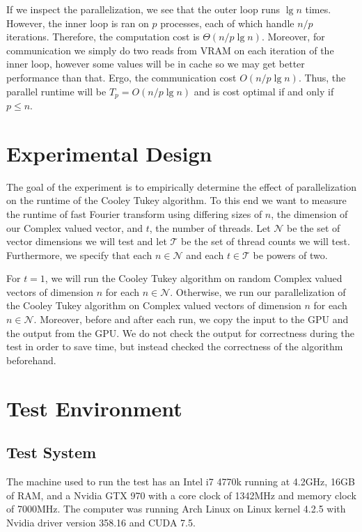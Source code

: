 \documentclass[notitlepage, twocolumn]{article}
\begin{document}
If we inspect the parallelization, we see that the outer loop runs $\lg n$ times.
However, the inner loop is ran on $p$ processes, each of which handle $n/p$ iterations.
Therefore, the computation cost is $\Theta(n/p\lg n)$.
Moreover, for communication we simply do two reads from VRAM on each iteration of the inner loop, however some values will be in cache so we may get better performance than that.
Ergo, the communication cost $O(n/p\lg n)$.
Thus, the parallel runtime will be $T_p = O(n/p \lg n)$ and is cost optimal if and only if $p\leq n$.

\section{Experimental Design}

The goal of the experiment is to empirically determine the effect of parallelization on the runtime of the Cooley Tukey algorithm.
To this end we want to measure the runtime of fast Fourier transform using differing sizes of $n$, the dimension of our Complex valued vector, and $t$, the number of threads.
Let $\mathcal{N}$ be the set of vector dimensions we will test and let $\mathcal{T}$ be the set of thread counts we will test.
Furthermore, we specify that each $n\in\mathcal{N}$ and each $t\in\mathcal{T}$ be powers of two.

For $t=1$, we will run the Cooley Tukey algorithm on random Complex valued vectors of dimension $n$ for each $n\in\mathcal{N}$.
Otherwise, we run our parallelization of the Cooley Tukey algorithm on Complex valued vectors of dimension $n$ for each $n\in\mathcal{N}$.
Moreover, before and after each run, we copy the input to the GPU and the output from the GPU.
We do not check the output for correctness during the test in order to save time, but instead checked the correctness of the algorithm beforehand.

\section{Test Environment}

\subsection{Test System}

The machine used to run the test has an Intel i7 4770k running at 4.2GHz, 16GB of RAM, and a Nvidia GTX 970 with a core clock of 1342MHz and memory clock of 7000MHz.
The computer was running Arch Linux on Linux kernel 4.2.5 with Nvidia driver version 358.16 and CUDA 7.5.
\end{document}
